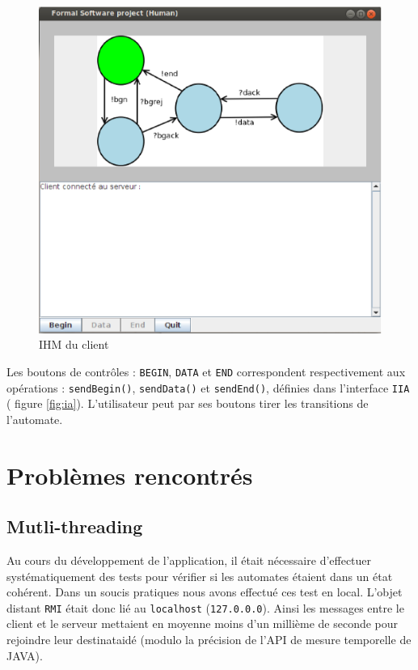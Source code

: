  \begin{figure}[htb]
   \centering
   \includegraphics[scale=.5]{img/ihmCLIENT.eps}
   \caption{IHM du client}
   \label{fig:ihmCLIENT}
 \end{figure}
Les boutons de contrôles :  \texttt{BEGIN}, \texttt{DATA} et \texttt{END} correspondent respectivement aux opérations : \texttt{sendBegin()}, \texttt{sendData()} et \texttt{sendEnd()}, définies dans l'interface \texttt{IIA} (\cf{} figure \ref{fig:ia}). L'utilisateur peut par ses boutons \og tirer \fg{} les transitions de l'automate.

\section{Problèmes rencontrés}
\subsection{Mutli-threading}
Au cours du développement de l'application, il était nécessaire d'effectuer systématiquement des tests pour vérifier si les automates étaient dans un état cohérent. Dans un soucis pratiques nous avons effectué ces test en local. L'objet \og distant \fg{} \texttt{RMI} était donc lié au \texttt{localhost} (\verb+127.0.0.0+). Ainsi les messages entre le client et le serveur mettaient en moyenne moins d'un millième de seconde pour rejoindre leur destinataidé (modulo la précision de l'API de mesure temporelle de \textsc{JAVA}).

